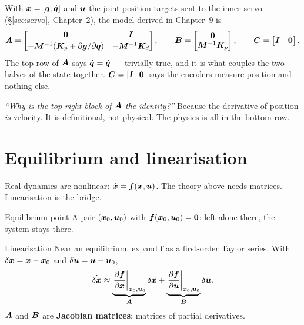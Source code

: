\begin{inproject}
With $\bm{x} = [\bm{q}; \dot{\bm{q}}]$ and $\bm{u}$ the joint position targets sent to the inner servo
(\S\ref{sec:servo}, Chapter~2), the model derived in Chapter~9 is
\[
\bm{A} = \begin{bmatrix} \bm{0} & \bm{I} \\[2pt]
      -\bm{M}^{-1}(\bm{K}_p + \partial \bm{g}/\partial \bm{q}) & -\bm{M}^{-1}\bm{K}_d \end{bmatrix},
\qquad
\bm{B} = \begin{bmatrix} \bm{0} \\ \bm{M}^{-1}\bm{K}_p \end{bmatrix},
\qquad
\bm{C} = \begin{bmatrix} \bm{I} & \bm{0} \end{bmatrix}.
\]
The top row of $\bm{A}$ says $\dot{\bm{q}} = \dot{\bm{q}}$ --- trivially true, and it is what couples the two halves
of the state together. $\bm{C} = [\bm{I}\ \ \bm{0}]$ says the encoders measure position and nothing else.
\end{inproject}

\begin{vivabox}
\emph{``Why is the top-right block of $\bm{A}$ the identity?''} Because the derivative of position
\emph{is} velocity. It is definitional, not physical. The physics is all in the bottom row.
\end{vivabox}

\section{Equilibrium and linearisation}
\label{sec:linearisation}

Real dynamics are nonlinear: $\dot{\bm{x}} = \bm{f}(\bm{x}, \bm{u})$. The theory above needs matrices. Linearisation
is the bridge.

\begin{definition}{Equilibrium point}
A pair $(\bm{x}_0, \bm{u}_0)$ with $\bm{f}(\bm{x}_0, \bm{u}_0) = \bm{0}$: left alone there, the system stays there.
\end{definition}

\begin{definition}{Linearisation}
Near an equilibrium, expand $\bm{f}$ as a first-order Taylor series. With
$\delta\bm{x} = \bm{x} - \bm{x}_0$ and $\delta\bm{u} = \bm{u} - \bm{u}_0$,
\[
\dot{\delta\bm{x}} \approx
\underbrace{\left.\frac{\partial \bm{f}}{\partial \bm{x}}\right|_{\bm{x}_0,\bm{u}_0}}_{\bm{A}} \delta\bm{x}
+ \underbrace{\left.\frac{\partial \bm{f}}{\partial \bm{u}}\right|_{\bm{x}_0,\bm{u}_0}}_{\bm{B}} \delta\bm{u} .
\]
$\bm{A}$ and $\bm{B}$ are \textbf{Jacobian matrices}: matrices of partial derivatives.
\end{definition}

